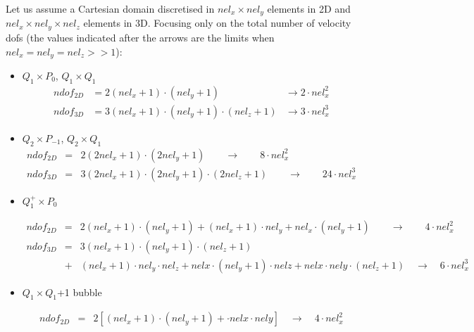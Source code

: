 Let us assume a Cartesian domain discretised in $nel_x \times nel_y$
elements in 2D and $nel_x \times nel_y \times nel_z$ elements in 3D.
Focusing only on the total number of velocity dofs (the values indicated after the 
arrows are the limits when $nel_x=nel_y=nel_z >> 1$):

\begin{itemize}

\item $Q_1 \times P_0$, $Q_1 \times Q_1$
\begin{align}
ndof_{2D}&= 2 (nel_x+1) \cdot (nel_y+1) 
& \rightarrow  2 \cdot nel_x^2   \\
ndof_{3D}&= 3 (nel_x+1) \cdot (nel_y+1) \cdot (nel_z+1)
& \rightarrow 3 \cdot nel_x^3 
\end{align}

\item $Q_2 \times P_{-1}$, $Q_2 \times Q_1$
\begin{eqnarray}
ndof_{2D}      &=&2 (2nel_x+1) \cdot (2nel_y+1) 
\qquad \rightarrow \qquad 8 \cdot nel_x^2   \nonumber\\
ndof_{3D}&=&3 (2nel_x+1) \cdot (2nel_y+1) \cdot (2nel_z+1)
\qquad \rightarrow \qquad 24 \cdot nel_x^3 \nonumber
\end{eqnarray}


\item $Q_1^+ \times P_0$

\begin{eqnarray}
ndof_{2D}     &=&2 (nel_x+1) \cdot (nel_y+1) + (nel_x+1)\cdot nel_y + nel_x\cdot(nel_y+1)
\qquad \rightarrow \qquad 4 \cdot nel_x^2   \nonumber\\
ndof_{3D}&=&3 (nel_x+1) \cdot (nel_y+1) \cdot (nel_z+1) \nonumber\\
&+&  (nel_x+1)\cdot nel_y \cdot nel_z + nelx\cdot (nel_y+1) \cdot nelz + nelx\cdot nely \cdot (nel_z+1)
\quad \rightarrow \quad 6 \cdot nel_x^3 \nonumber
\end{eqnarray}

\item $Q_1 \times Q_1$+1 bubble

\begin{eqnarray}
ndof_{2D}&=& 2[(nel_x+1) \cdot (nel_y+1)  + \cdot nelx\cdot nely ]
\quad \rightarrow \quad 4 \cdot nel_x^2 \nonumber
\end{eqnarray}



\end{itemize}

